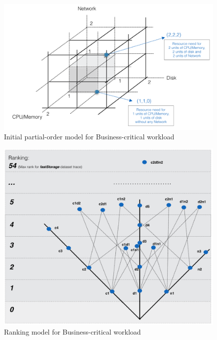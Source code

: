 \documentclass[10pt,conference,compsocconf]{IEEEtran}
\begin{document}
\begin{itemize}
\begin{figure}
\centering
\includegraphics[scale=0.35]{InP.png}
\caption{Initial partial-order model for Business-critical workload}
\label{fig:f7}
\end{figure} 


\begin{figure}
\centering
\includegraphics[scale=0.25]{InR.png}
\caption{Ranking model for Business-critical workload}
\label{fig:f8}
\end{figure} 
\end{itemize}
\end{document}
